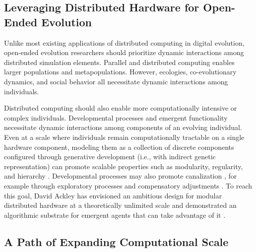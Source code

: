 \subsection{Leveraging Distributed Hardware for Open-Ended Evolution}

Unlike most existing applications of distributed computing in digital evolution, open-ended evolution researchers should prioritize dynamic interactions among distributed simulation elements.
Parallel and distributed computing enables larger populations and metapopulations.
However, ecologies, co-evolutionary dynamics, and social behavior all necessitate dynamic interactions among individuals.

Distributed computing should also enable more computationally intensive or complex individuals.
Developmental processes and emergent functionality necessitate dynamic interactions among components of an evolving individual.
Even at a scale where individuals remain computationally tractable on a single hardware component, modeling them as a collection of discrete components configured through generative development (i.e., with indirect genetic representation) can promote scalable properties \cite{lipson2007principles} such as modularity, regularity, and hierarchy \cite{hornby2005measuring, clune2011performance}.
Developmental processes may also promote canalization \cite{stanley2003taxonomy}, for example through exploratory processes and compensatory adjustments \cite{gerhart2007theory}.
To reach this goal, David Ackley has envisioned an ambitious design for modular distributed hardware at a theoretically unlimited scale \cite{ackley2011pursue} and demonstrated an algorithmic substrate for emergent agents that can take advantage of it \cite{ackley2018digital}.

\subsection{A Path of Expanding Computational Scale}

